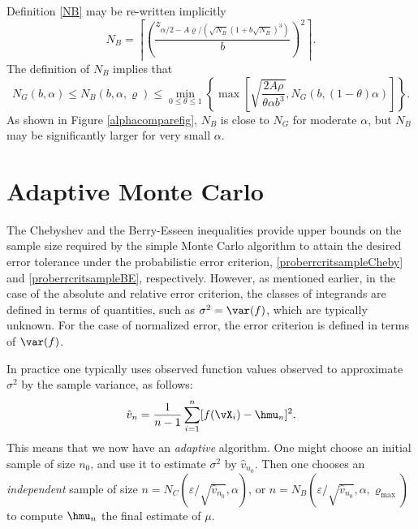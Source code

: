 \documentclass[12pt]{amsart}
\newcommand{\hv}{\hat{v}}
\begin{document}
Definition \eqref{NB} may be re-written implicitly
\begin{equation}\label{NBalt}
N_B = \left \lceil \left(\frac{z_{\alpha/2 -  A
\varrho/(\sqrt{N_B}(1+b\sqrt{N_B})^3)}}{b}\right)^2 \right \rceil.
\end{equation}
The definition of $N_B$ implies that
\[
N_G(b,\alpha) \le N_B(b,\alpha,\varrho) \le \min_{0 \le
\theta \le 1} \left\{\max\left[ \sqrt{\frac{2A
\rho}{\theta\alpha b^3}},
 N_G(b,(1-\theta)\alpha)  \right] \right\}.
\]
As shown in Figure \ref{alphacomparefig}, $N_B$ is close to $ N_G$ for moderate $\alpha$, but $N_B$ may be significantly larger for very small $\alpha$.

\section{Adaptive Monte Carlo}
The Chebyshev and the Berry-Esseen inequalities provide upper bounds on the sample size required by the simple Monte Carlo algorithm to attain the desired error tolerance under the probabilistic error criterion, \eqref{proberrcritsampleCheby} and \eqref{proberrcritsampleBE}, respectively.  However, as mentioned earlier, in the case of the absolute and relative error criterion, the classes of integrands are defined in terms of quantities, such as $\sigma^2=\var(f)$, which are typically unknown.  For the case of normalized error, the error criterion is defined in terms of $\var(f)$.  

In practice one typically uses observed function values observed to approximate $\sigma^2$ by the sample variance, as follows:
\begin{equation} \label{samplevar}
\hv_{n} = \frac 1{n-1} \sum_{i=1}^{n} [f(\vX_i)- \hmu_{n}]^2.
\end{equation}
This means that we now have an \emph{adaptive} algorithm.  One might choose an initial sample of size $n_0$, and use it to estimate $\sigma^2$ by $\hv_{n_0}$.  Then one chooses an \emph{independent} sample of size $n=N_{C}(\varepsilon/\sqrt{\hv_{n_0}},\alpha)$, or  $n=N_{B}(\varepsilon/\sqrt{\hv_{n_0}},\alpha,\varrho_{\max})$ to compute $\hmu_n$ the final estimate of $\mu$.
\end{document}
